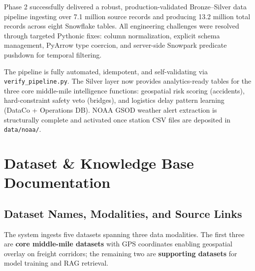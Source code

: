 \documentclass[14.5pt,letterpaper]{article}
\begin{document}
Phase 2 successfully delivered a robust, production-validated Bronze--Silver data pipeline ingesting over 7.1 million source records and producing 13.2 million total records across eight Snowflake tables. All engineering challenges were resolved through targeted Pythonic fixes: column normalization, explicit schema management, PyArrow type coercion, and server-side Snowpark predicate pushdown for temporal filtering.

The pipeline is fully automated, idempotent, and self-validating via \texttt{verify\_pipeline.py}. The Silver layer now provides analytics-ready tables for the three core middle-mile intelligence functions: geospatial risk scoring (accidents), hard-constraint safety veto (bridges), and logistics delay pattern learning (DataCo + Operations DB). NOAA GSOD weather alert extraction is structurally complete and activated once station CSV files are deposited in \texttt{data/noaa/}.

\newpage
\appendix

\section{Dataset \& Knowledge Base Documentation}
\label{app:datasets}

\subsection{Dataset Names, Modalities, and Source Links}

The system ingests five datasets spanning three data modalities. The first three are \textbf{core middle-mile datasets} with GPS coordinates enabling geospatial overlay on freight corridors; the remaining two are \textbf{supporting datasets} for model training and RAG retrieval.
\end{document}

